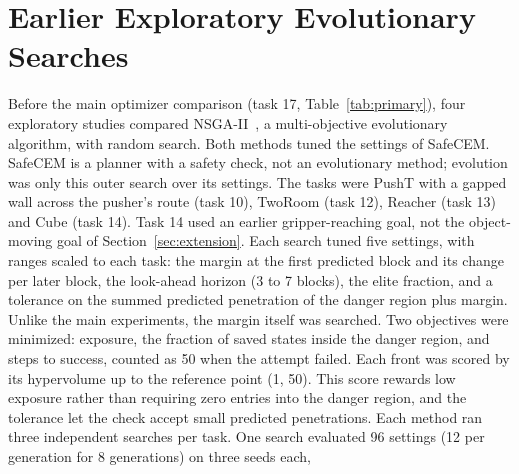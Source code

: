 \section{Earlier Exploratory Evolutionary Searches}\label{app:evo-history}
Before the main optimizer comparison (task 17, Table~\ref{tab:primary}), four
exploratory studies compared NSGA-II~\cite{deb2002nsga2}, a multi-objective evolutionary
algorithm, with random search. Both methods tuned the settings of SafeCEM. SafeCEM is a planner with a
safety check, not an evolutionary method; evolution was only this outer search over
its settings. The tasks were PushT with a gapped wall across the pusher's route
(task 10), TwoRoom (task 12), Reacher (task 13) and Cube (task 14). Task 14 used an
earlier gripper-reaching goal, not the object-moving goal of
Section~\ref{sec:extension}.
Each search tuned five settings, with ranges scaled to each task: the margin at the
first predicted block and its change per later block, the look-ahead horizon (3 to 7
blocks), the elite fraction, and a tolerance on the summed predicted penetration of the
danger region plus margin. Unlike the main experiments, the margin itself was searched.
Two objectives were minimized: exposure, the fraction of saved states inside the danger
region, and steps to success, counted as 50 when the attempt failed. Each front was
scored by its hypervolume up to the reference point (1, 50). This score rewards low
exposure rather than requiring zero entries into the danger region, and the tolerance let the check accept
small predicted penetrations. Each method ran three independent searches per task. One
search evaluated 96 settings (12 per generation for 8 generations) on three seeds each,
